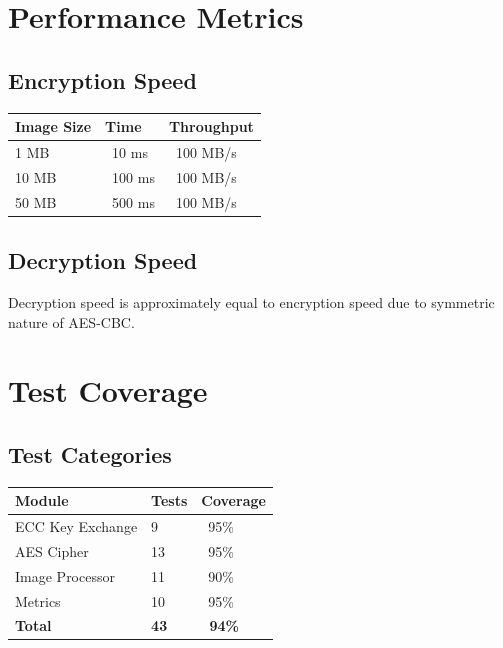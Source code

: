 \documentclass[12pt,a4paper]{report}
\begin{document}
\section{Performance Metrics}

\subsection{Encryption Speed}

\begin{table}[H]
    \centering
    \begin{tabular}{|l|l|l|}
    \hline
    \textbf{Image Size} & \textbf{Time} & \textbf{Throughput} \\
    \hline
    1 MB & ~10 ms & ~100 MB/s \\
    10 MB & ~100 ms & ~100 MB/s \\
    50 MB & ~500 ms & ~100 MB/s \\
    \hline
    \end{tabular}
\end{table}

\subsection{Decryption Speed}

Decryption speed is approximately equal to encryption speed due to symmetric nature of AES-CBC.

\section{Test Coverage}

\subsection{Test Categories}

\begin{table}[H]
    \centering
    \begin{tabular}{|l|l|l|}
    \hline
    \textbf{Module} & \textbf{Tests} & \textbf{Coverage} \\
    \hline
    ECC Key Exchange & 9 & ~95\% \\
    AES Cipher & 13 & ~95\% \\
    Image Processor & 11 & ~90\% \\
    Metrics & 10 & ~95\% \\
    \hline
    \textbf{Total} & \textbf{43} & \textbf{~94\%} \\
    \hline
    \end{tabular}
\end{table}
\end{document}
